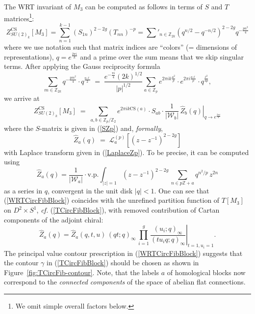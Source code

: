 \documentclass[hyper,letterpaper]{JHEP3}
\newcommand{\Z}{{\mathbb Z}}
\renewcommand{\hat}{\widehat}
\def\CL{{\mathcal L}}
\def\CW{{\mathcal W}}
\begin{document}
The WRT invariant of $M_3$ can be computed as follows in terms of $S$ and $T$ matrices\footnote{We omit simple overall factors below.}:
\begin{equation}
	Z_{SU(2)_k}^\text{CS}[M_3]=\sum_{n=1}^{k-1} (S_{1n})^{2-2g}(T_{nn})^{-p}=
	{\sum}'_{n\in \Z_{2k}} (q^{n/2}-q^{-n/2})^{2-2g}q^{-\frac{pn^2}{4}}
\end{equation}
where we use notation such that matrix indices are ``colors'' (= dimensions of representations),
$q=e^{\frac{2\pi i}{k}}$ and a prime over the sum means that we skip singular terms.
After applying the Gauss reciprocity formula
\begin{equation}
	\sum_{m\in \Z_{2k}}q^{-\frac{pm^2}{4}}\cdot q^{\frac{n\ell}{2}} \; = \;
	\frac{e^{-\frac{\pi i}{4}}(2k)^{1/2}}{|p|^{1/2}}
	\sum_{a\in \Z_p} e^{2\pi i k\frac{a^2}{p}}\cdot
	e^{2\pi i \frac{a\ell}{p}}\cdot
	q^{\frac{\ell^2}{4p}},
\end{equation}
we arrive at
\begin{equation}
	Z_{SU(2)_k}^\text{CS}[M_3]
	\; = \; \sum_{a,b\in \Z_p /\Z_2} e^{2\pi ik\text{CS}(a)}\cdot
	S_{ab}\cdot \frac{1}{|\CW_b|}\,\left.\hat{Z}_b(q)\right|_{q\rightarrow e^{\frac{2\pi i}{k}}}
\end{equation}
where the $S$-matrix is given in (\ref{SZp}) and, \textit{formally},
\begin{equation}
	\hat{Z}_a(q) \; = \; \CL_a^{(p)}\left[(z-z^{-1})^{2-2g}\right]
\end{equation}
with Laplace transform given in (\ref{LaplaceZp}). To be precise, it can be computed using
\begin{equation}
	\hat{Z}_a(q)=\frac{1}{|\CW_a|}\cdot\text{v.p.}
	\int_{|z|=1}(z-z^{-1})^{2-2g}\,\sum_{n\in p\Z+a}q^{n^2/p}\,z^{2n}
	\label{WRTCircFibBlock}
\end{equation}
as a series in $q$, convergent in the unit disk $|q|<1$. One can see that (\ref{WRTCircFibBlock}) coincides with the unrefined partition function of $T[M_3]$ on $D^2\times S^1$, {\it cf.} (\ref{TCircFibBlock}), with removed contribution of Cartan components of the adjoint chiral:
\begin{equation}
	\hat{Z}_a(q)=\left.\hat{Z}_a(q,t,u)\,(qt;q)_\infty\,\prod_{i=1}^g\frac{(u_i;q)_\infty}{(tu_iq;q)_\infty}\right|_{t=1,u_i=1}.
\end{equation}
The principal value contour prescription in (\ref{WRTCircFibBlock}) suggests that the contour $\gamma$ in (\ref{TCircFibBlock}) should be chosen as shown in  Figure~\ref{fig:TCircFib-contour}. Note, that the labels $a$ of homological blocks now correspond to the \textit{connected components} of the space of abelian flat connections.
\end{document}
